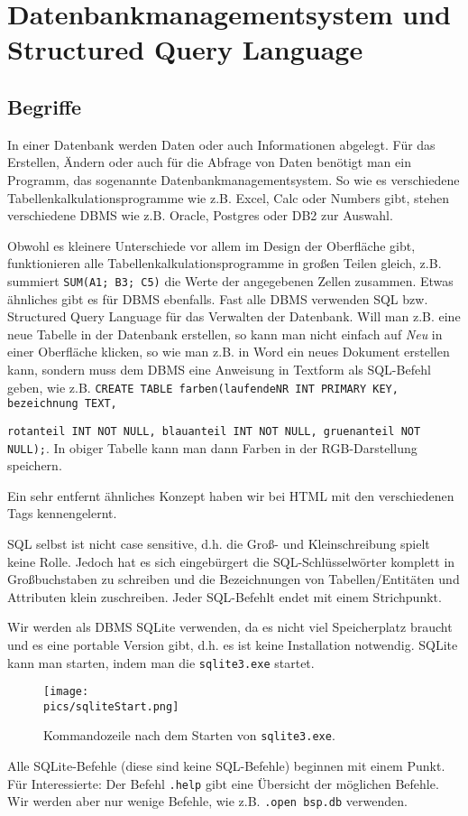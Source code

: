 \section[DBMS und SQL]{Datenbankmanagementsystem und Structured Query Language}
\subsection{Begriffe}
In einer Datenbank werden Daten oder auch Informationen abgelegt. Für das Erstellen, Ändern oder auch für die Abfrage von Daten benötigt man ein Programm, das sogenannte Datenbankmanagementsystem. So wie es verschiedene Tabellenkalkulationsprogramme wie z.B. Excel, Calc oder Numbers gibt, stehen  verschiedene DBMS wie z.B. Oracle, Postgres oder DB2 zur Auswahl.

Obwohl es kleinere Unterschiede vor allem im Design der Oberfläche gibt, funktionieren alle Tabellenkalkulationsprogramme in großen Teilen gleich, z.B. summiert \lstinline!SUM(A1; B3; C5)! die Werte der angegebenen Zellen zusammen. Etwas ähnliches gibt es für DBMS ebenfalls. Fast alle DBMS verwenden SQL bzw. Structured Query Language für das Verwalten der Datenbank. Will man z.B. eine neue Tabelle in der Datenbank erstellen, so kann man nicht einfach auf \textit{Neu} in einer Oberfläche klicken, so wie man z.B. in Word ein neues Dokument erstellen kann, sondern muss dem DBMS eine Anweisung in Textform als SQL-Befehl geben, wie z.B.
 \lstinline!CREATE TABLE farben(laufendeNR INT PRIMARY KEY, bezeichnung TEXT,!

\lstinline!rotanteil INT NOT NULL, blauanteil INT NOT NULL, gruenanteil NOT NULL);!.
In obiger Tabelle kann man dann Farben in der RGB-Darstellung speichern.

Ein sehr entfernt ähnliches Konzept haben wir bei HTML mit den verschiedenen Tags kennengelernt.

SQL selbst ist nicht case sensitive, d.h. die Groß- und Kleinschreibung spielt keine Rolle. Jedoch hat es sich eingebürgert die SQL-Schlüsselwörter komplett in Großbuchstaben zu schreiben und die Bezeichnungen von Tabellen/Entitäten und Attributen klein zuschreiben. Jeder SQL-Befehlt endet mit einem Strichpunkt.

Wir werden als DBMS SQLite verwenden, da es nicht viel Speicherplatz braucht und es eine portable Version gibt, d.h. es ist keine Installation notwendig. SQLite kann man starten, indem man die \texttt{sqlite3.exe} startet.

\begin{figure}[h]
	\centering
	\texttt{[image: \\pics/sqliteStart.png]}
	\caption*{Kommandozeile nach dem Starten von \texttt{sqlite3.exe}.}
\end{figure}
Alle SQLite-Befehle (diese sind keine SQL-Befehle) beginnen mit einem Punkt. Für Interessierte: Der Befehl \lstinline!.help! gibt eine Übersicht der möglichen Befehle. Wir werden aber nur wenige Befehle, wie z.B. \lstinline!.open bsp.db! verwenden.